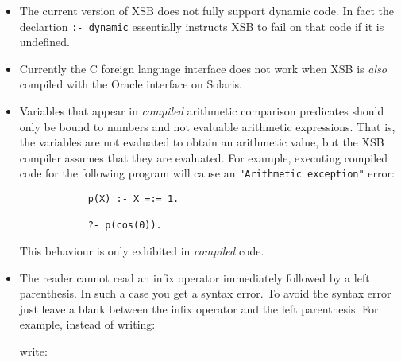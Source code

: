 \begin{itemize}
\item The current version of XSB does not fully support dynamic code.
In fact the declartion {\tt :- dynamic} essentially instructs XSB to
fail on that code if it is undefined.
%
\item Currently the C foreign language interface does not work when
      XSB is {\em also} compiled with the Oracle interface on Solaris.
\item Variables that appear in {\em compiled} arithmetic comparison
      predicates should only be bound to numbers and not evaluable
      arithmetic expressions.  That is, the variables are not evaluated
      to obtain an arithmetic value, but the XSB compiler assumes
      that they are evaluated.  For example, executing compiled code for
      the following program will cause an {\tt "Arithmetic exception"}
      error:
      \begin{verbatim}
            p(X) :- X =:= 1.

            ?- p(cos(0)).
      \end{verbatim}
      This behaviour is only exhibited in {\em compiled} code.
\item The reader cannot read an infix operator immediately followed 
      by a left parenthesis.  In such a case you get a syntax error.
      To avoid the syntax error just leave a blank between the infix
      operator and the left parenthesis.  For example, instead of 
      writing:


      \noindent
      write:


\end{itemize}
